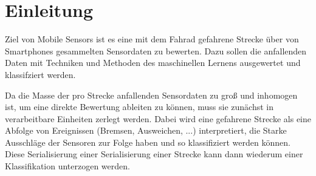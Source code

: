 \chapter{Einleitung}
Ziel von Mobile Sensors ist es eine mit dem Fahrad gefahrene Strecke über von Smartphones gesammelten Sensordaten zu bewerten.
Dazu sollen die anfallenden Daten mit Techniken und Methoden des maschinellen Lernens ausgewertet und klassifziert werden.

Da die Masse der pro Strecke anfallenden Sensordaten zu groß und inhomogen ist, um eine direkte Bewertung ableiten zu können, muss sie zunächst in verarbeitbare Einheiten zerlegt werden. 
Dabei wird eine gefahrene Strecke als eine Abfolge von Ereignissen (Bremsen, Ausweichen, ...) interpretiert, die Starke Ausschläge der Sensoren zur Folge haben und so klassifiziert werden können.
Diese Serialisierung einer Serialisierung einer Strecke kann dann wiederum einer Klassifikation unterzogen werden.